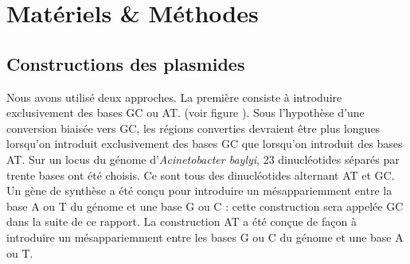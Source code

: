 

\section{Matériels \& Méthodes}
\label{sec:materiel}


\subsection{Constructions des plasmides}
\label{subsec:constructions}


Nous avons utilisé deux approches. La première consiste à introduire
exclusivement des bases GC ou AT. (voir figure \label{img:strategies}). Sous
l'hypothèse d'une conversion biaisée vers GC, les régions converties devraient
être plus longues lorsqu'on introduit exclusivement des bases GC que lorsqu'on
introduit des bases AT. Sur un locus du génome d'\emph{Acinetobacter
  baylyi}, 23 dinucléotides séparés par trente bases ont été choisis. Ce sont
tous des dinucléotides alternant AT et GC. Un gène de synthèse a été conçu pour
introduire un mésappariemment entre la base A ou T du génome et une base G ou C
: cette construction sera appelée GC dans la suite de ce rapport. La
construction AT a été conçue de façon à introduire un mésappariemment entre les
bases G ou C du génome et une base A ou T.

